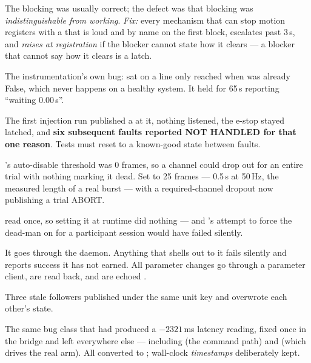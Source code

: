{The blocking was usually correct; the defect was that blocking was
\emph{indistinguishable from working}. \textit{Fix:} every mechanism that can
stop motion registers with a  that is loud and by name on
the first block, escalates past 3\,s, and \emph{raises at registration} if the
blocker cannot state how it clears --- a blocker that cannot say how it clears
is a latch.}

{The instrumentation's own bug:  sat on a line only reached when
 was already False, which never happens on a healthy system. It
held for 65\,s reporting ``waiting 0.00\,s''.}

{The first injection run published a  at it, nothing listened, the
e-stop stayed latched, and \textbf{six subsequent faults reported NOT HANDLED
for that one reason}. Tests must reset to a known-good state between faults.}

{'s auto-disable threshold was 0 frames, so a channel
could drop out for an entire trial with nothing marking it dead. Set to 25
frames --- 0.5\,s at 50\,Hz, the measured length of a real  burst ---
with a required-channel dropout now publishing a trial ABORT.}

{ read  once, so setting it at runtime
did nothing --- and 's attempt to force the
dead-man on for a participant session would have failed silently.}

{It goes through the daemon. Anything that shells out to it fails silently and
reports success it has not earned. All parameter changes go through a parameter
client, are read back, and are echoed .}

{Three stale followers published under the same unit key and overwrote each
other's state.}

{The same bug class that had produced a $-2321$\,ms latency reading, fixed once
in the bridge and left everywhere else --- including 
(the command path) and  (which drives the real arm).
All converted to ; wall-clock \emph{timestamps}
deliberately kept.}

